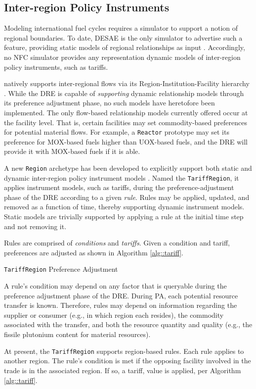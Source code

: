 \subsection{Inter-region Policy Instruments}\label{meth:tariff}

Modeling international fuel cycles requires a simulator to support a notion of
regional boundaries. To date, DESAE is the only simulator to advertise such a
feature, providing static models of regional relationships as input
\cite{andrianova_desae_2008}. Accordingly, no NFC simulator provides any
representation dynamic models of inter-region policy instruments, such as
tariffs.

\Cyclus natively supports inter-regional flows via its
Region-Institution-Facility hierarchy \cite{huff_cyclus_2015}. While the DRE is
capable of \textit{supporting} dynamic relationship models through its
preference adjustment phase, no such models have heretofore been
implemented. The only flow-based relationship models currently offered occur at
the facility level. That is, certain facilities may set commodity-based
preferences for potential material flows. For example, a \texttt{Reactor}
prototype may set its preference for MOX-based fuels higher than UOX-based
fuels, and the DRE will provide it with MOX-based fuels if it is able.

A new \texttt{Region} archetype has been developed to explicitly support both
static and dynamic inter-region policy instrument models
\cite{tariff_region_doi}. Named the \texttt{TariffRegion}, it applies instrument
models, such as tariffs, during the preference-adjustment phase of the DRE
according to a given \textit{rule}. Rules may be applied, updated, and removed
as a function of time, thereby supporting dynamic instrument models. Static
models are trivially supported by applying a rule at the initial time step and
not removing it.

Rules are comprised of \textit{conditions} and \textit{tariffs}. Given a
condition and tariff, preferences are adjusted as shown in Algorithm
\ref{alg::tariff}.

\begin{algorithm}[!h]
 \SetAlgoLined
 \caption{\texttt{TariffRegion} Preference Adjustment}\label{alg::tariff}
\end{algorithm}

A rule's condition may depend on any factor that is queryable during the
preference adjustment phase of the DRE. During PA, each potential resource
transfer is known. Therefore, rules may depend on information regarding the
supplier or consumer (e.g., in which region each resides), the commodity
associated with the transfer, and both the resource quantity and quality (e.g.,
the fissile plutonium content for material resources). 

At present, the \texttt{TariffRegion} supports region-based rules. Each rule
applies to another region. The rule's condition is met if the opposing facility
involved in the trade is in the associated region. If so, a tariff, value is
applied, per Algorithm \ref{alg::tariff}.

